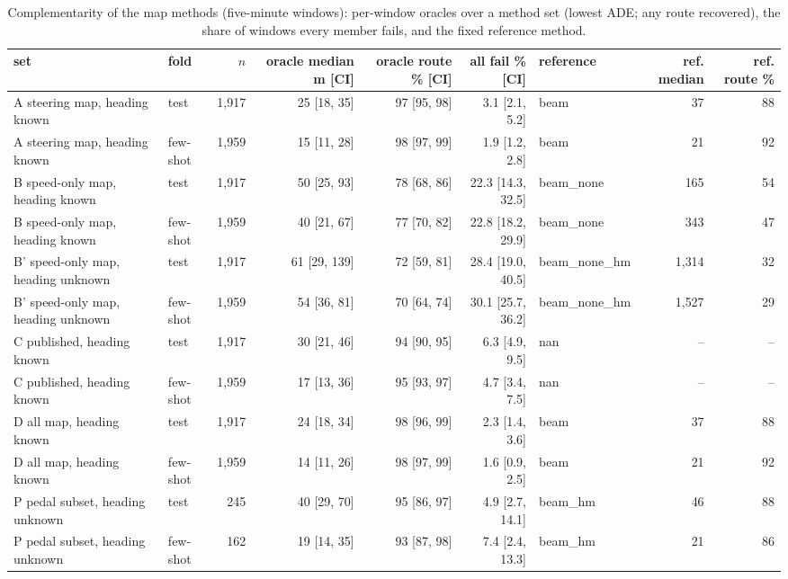 \begin{table}[t]\centering\scriptsize\setlength{\tabcolsep}{3pt}
\caption{Complementarity of the map methods (five-minute windows): per-window oracles over a method set (lowest ADE; any route recovered), the share of windows every member fails, and the fixed reference method.}\label{tab:supp_comp}
\begin{tabular}{llrrrrlrr}\toprule
set & fold & $n$ & oracle median m [CI] & oracle route \% [CI] & all fail \% [CI] & reference & ref. median & ref. route \% \\\midrule
A steering map, heading known & test & 1{,}917 & 25 [18, 35] & 97 [95, 98] & 3.1 [2.1, 5.2] & beam & 37 & 88 \\
A steering map, heading known & few-shot & 1{,}959 & 15 [11, 28] & 98 [97, 99] & 1.9 [1.2, 2.8] & beam & 21 & 92 \\
B speed-only map, heading known & test & 1{,}917 & 50 [25, 93] & 78 [68, 86] & 22.3 [14.3, 32.5] & beam\_none & 165 & 54 \\
B speed-only map, heading known & few-shot & 1{,}959 & 40 [21, 67] & 77 [70, 82] & 22.8 [18.2, 29.9] & beam\_none & 343 & 47 \\
B' speed-only map, heading unknown & test & 1{,}917 & 61 [29, 139] & 72 [59, 81] & 28.4 [19.0, 40.5] & beam\_none\_hm & 1{,}314 & 32 \\
B' speed-only map, heading unknown & few-shot & 1{,}959 & 54 [36, 81] & 70 [64, 74] & 30.1 [25.7, 36.2] & beam\_none\_hm & 1{,}527 & 29 \\
C published, heading known & test & 1{,}917 & 30 [21, 46] & 94 [90, 95] & 6.3 [4.9, 9.5] & nan & -- & -- \\
C published, heading known & few-shot & 1{,}959 & 17 [13, 36] & 95 [93, 97] & 4.7 [3.4, 7.5] & nan & -- & -- \\
D all map, heading known & test & 1{,}917 & 24 [18, 34] & 98 [96, 99] & 2.3 [1.4, 3.6] & beam & 37 & 88 \\
D all map, heading known & few-shot & 1{,}959 & 14 [11, 26] & 98 [97, 99] & 1.6 [0.9, 2.5] & beam & 21 & 92 \\
P pedal subset, heading unknown & test & 245 & 40 [29, 70] & 95 [86, 97] & 4.9 [2.7, 14.1] & beam\_hm & 46 & 88 \\
P pedal subset, heading unknown & few-shot & 162 & 19 [14, 35] & 93 [87, 98] & 7.4 [2.4, 13.3] & beam\_hm & 21 & 86 \\
\bottomrule\end{tabular}
\end{table}
